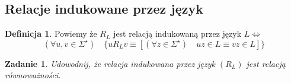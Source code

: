 \documentclass[12pt,a4paper]{article}
\newtheorem{zad}{Zadanie}
\theoremstyle{definition}
\newtheorem{df}{Definicja}
\theoremstyle{remark}
\begin{document}
\subsection{Relacje indukowane przez język}	
	
	\begin{df}
		Powiemy że $R_L$ jest relacją indukowaną przez język 
		$L \Leftrightarrow$ $$ (\forall u,v \in \Sigma^\star) \quad \{uR_Lv \equiv [(\forall z\in \Sigma^\star) \quad uz\in L \equiv vz\in L]\}$$
	\end{df}	
	
	\begin{zad} 
		Udowodnij, że relacja indukowana przez język $(R_L)$ jest relacją równoważności.
	\end{zad}
	
\end{document}
